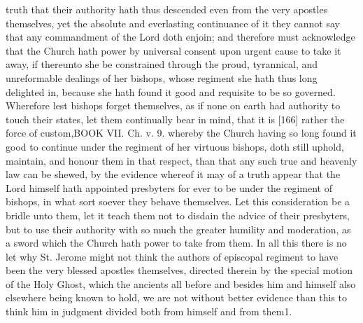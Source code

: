truth that their authority hath thus descended even from the very apostles themselves, yet the absolute and everlasting continuance of it they cannot say that any commandment of the Lord doth enjoin; and therefore must acknowledge that the Church hath power by universal consent upon urgent cause to take it away, if thereunto she be constrained through the proud, tyrannical, and unreformable dealings of her bishops, whose regiment she hath thus long delighted in, because she hath found it good and requisite to be so governed. Wherefore lest bishops forget themselves, as if none on earth had authority to touch their states, let them continually bear in mind, that it is [166] rather the force of custom,BOOK VII. Ch. v. 9. whereby the Church having so long found it good to continue under the regiment of her virtuous bishops, doth still uphold, maintain, and honour them in that respect, than that any such true and heavenly law can be shewed, by the evidence whereof it may of a truth appear that the Lord himself hath appointed presbyters for ever to be under the regiment of bishops, in what sort soever they behave themselves. Let this consideration be a bridle unto them, let it teach them not to disdain the advice of their presbyters, but to use their authority with so much the greater humility and moderation, as a sword which the Church hath power to take from them. In all this there is no let why St. Jerome might not think the authors of episcopal regiment to have been the very blessed apostles themselves, directed therein by the special motion of the Holy Ghost, which the ancients all before and besides him and himself also elsewhere being known to hold, we are not without better evidence than this to think him in judgment divided both from himself and from them1.

